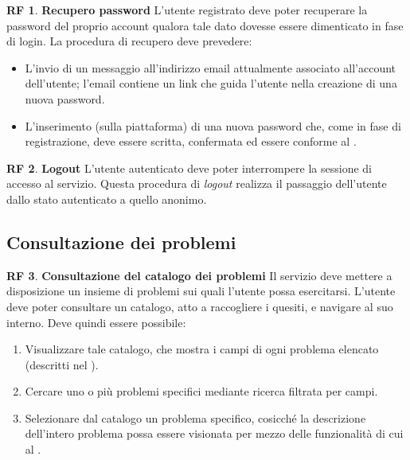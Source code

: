 \documentclass[11pt, a4paper]{article}
\theoremstyle{definition}
\newtheorem{funcreq}{RF} %
\begin{document}
\begin{funcreq}
\label{savepassword}
\textbf{Recupero password }
L'utente registrato deve poter recuperare la password del proprio account
qualora tale dato dovesse essere dimenticato in fase di login. La procedura
di recupero deve prevedere:
\begin{itemize}
    \item L'invio di un messaggio all'indirizzo email attualmente associato
    all'account dell'utente; l'email contiene un link che guida l'utente
    nella creazione di una nuova password.

    \item L'inserimento (sulla piattaforma) di una nuova password che,
    come in fase di registrazione, deve essere scritta, confermata ed essere
    conforme al .
\end{itemize}
\end{funcreq}

\begin{funcreq}
\label{logout}
\textbf{Logout }
L'utente autenticato deve poter interrompere la sessione di accesso
al servizio. Questa procedura di \textit{logout} realizza il passaggio dell'utente
dallo stato autenticato a quello anonimo.
\end{funcreq}

\subsection{Consultazione dei problemi}

\begin{funcreq}
\label{probcatalogue}
\textbf{Consultazione del catalogo dei problemi }
Il servizio deve mettere a disposizione un insieme di problemi sui quali
l'utente possa esercitarsi. L'utente deve poter consultare un catalogo,
atto a raccogliere i quesiti, e navigare al suo interno. Deve quindi
essere possibile:
\begin{enumerate}
    \item Visualizzare tale catalogo, che mostra i campi di ogni problema
    elencato (descritti nel ).
    
    \item Cercare uno o più problemi specifici mediante ricerca filtrata
    per campi.

    \item Selezionare dal catalogo un problema specifico, cosicché la
    descrizione dell'intero problema possa essere visionata per mezzo
    delle funzionalità di cui al .
\end{enumerate}
\end{funcreq}
\end{document}
